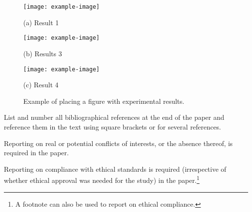 \documentclass{article}
\begin{document}
\begin{figure}[htb]

\begin{minipage}[b]{1.0\linewidth}
  \centering
  \centerline{\texttt{[image: example-image]}}
  \centerline{(a) Result 1}\medskip
\end{minipage}
%
\begin{minipage}[b]{.48\linewidth}
  \centering
  \centerline{\texttt{[image: example-image]}}
  \centerline{(b) Results 3}\medskip
\end{minipage}
\hfill
\begin{minipage}[b]{0.48\linewidth}
  \centering
  \centerline{\texttt{[image: example-image]}}
  \centerline{(c) Result 4}\medskip
\end{minipage}
%
\caption{Example of placing a figure with experimental results.}
\label{fig:res}
%
\end{figure}

List and number all bibliographical references at the end of the paper and
reference them in the text using square brackets \cite{C2} or \cite{C2, Lamp86}
for several references.

Reporting on real or potential conflicts of interests, or the absence thereof, is
required in the paper.

Reporting on compliance with ethical standards is required (irrespective of
whether ethical approval was needed for the study) in the
paper.\footnote{A footnote can also be used to report on ethical compliance.}



\end{document}
